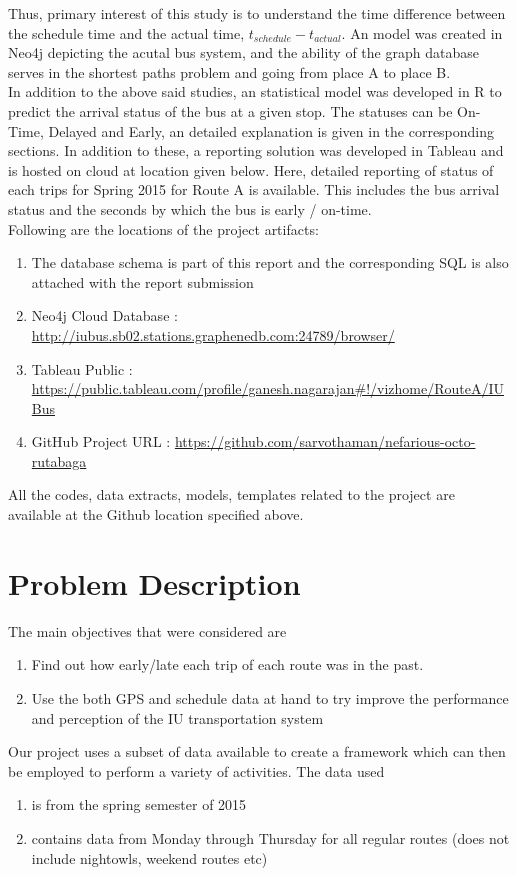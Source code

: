 \documentclass[12pt]{article}\usepackage[]{graphicx}\usepackage[]{color}
\begin{document}
Thus, primary interest of this study is to understand the time difference between the schedule time and the actual time, $t_{schedule} - t_{actual}$. An model was created in Neo4j depicting the acutal bus system, and the ability of the graph database serves in the shortest paths problem and going from place A to place B. \\

In addition to the above said studies, an statistical model was developed in R to predict the arrival status of the bus at a given stop. The statuses can be On-Time, Delayed and Early, an detailed explanation is given in the corresponding sections. In addition to these, a reporting solution was developed in Tableau and is hosted on cloud at location given below. Here, detailed reporting of status of each trips for Spring 2015 for Route A is available. This includes the bus arrival status and the seconds by which the bus is early / on-time. \\

Following are the locations of the project artifacts:
\begin{enumerate}
\item The database schema is part of this report and the corresponding SQL is also attached with the report submission
\item Neo4j Cloud Database : \url{http://iubus.sb02.stations.graphenedb.com:24789/browser/}
\item Tableau Public : \url{https://public.tableau.com/profile/ganesh.nagarajan#!/vizhome/RouteA/IUBus}
\item GitHub Project URL : \url{https://github.com/sarvothaman/nefarious-octo-rutabaga}
\end{enumerate}
All the codes, data extracts, models, templates related to the project are available at the Github location specified above.

\section{Problem Description}
The main objectives that were considered are
\begin{enumerate}
\item Find out how early/late each trip of each route was in the past. 
\item Use the both GPS and schedule data at hand to try improve the performance and perception of the IU transportation system
\end{enumerate}
Our project uses a subset of data available to create a framework which can then be employed to perform a variety of activities. The data used
\begin{enumerate}
\item is from the spring semester of 2015
\item contains data from Monday through Thursday for all regular routes (does not include nightowls, weekend routes etc)
\end{enumerate}
\end{document}
